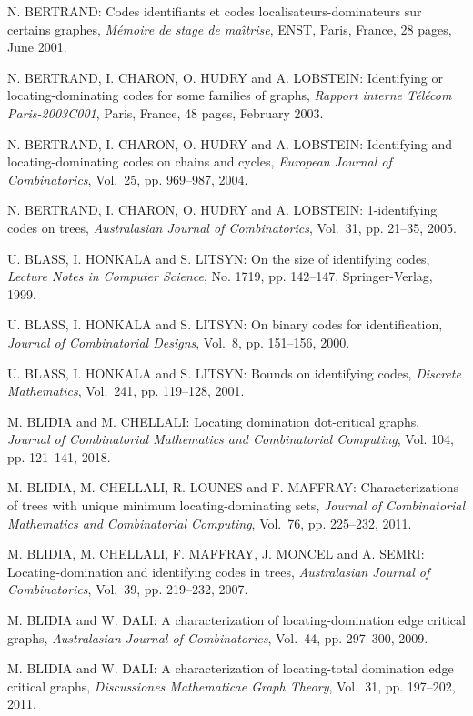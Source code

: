 \begin{thebibliography}{999}
N. BERTRAND: Codes identifiants et codes localisateurs-dominateurs sur certains graphes, {\it M\'emoire de stage de ma\^{\i}trise}, ENST, Paris, France, 28 pages, June 2001.

N. BERTRAND, I. CHARON, O. HUDRY and A. LOBSTEIN: Identifying or locating-dominating codes for some families of graphs, {\it Rapport interne T\'el\'ecom Paris-2003C001}, Paris, France, 48 pages, February 2003.

N. BERTRAND, I. CHARON, O. HUDRY and A. LOBSTEIN: Identifying and locating-dominating codes on chains and cycles, {\it European Journal of Combinatorics}, Vol.~25, pp. 969--987, 2004.

N. BERTRAND, I. CHARON, O. HUDRY and A. LOBSTEIN: 1-identifying codes on trees, {\it Australasian Journal of Combinatorics}, Vol.~31, pp. 21--35, 2005.

U. BLASS, I. HONKALA and S. LITSYN: On the size of identifying codes, {\it Lecture Notes in Computer Science}, No. 1719, pp. 142--147, Springer-Verlag, 1999.

U. BLASS, I. HONKALA and S. LITSYN: On binary codes for identification, {\it Journal of Combinatorial Designs}, Vol.~8, pp. 151--156, 2000.

U. BLASS, I. HONKALA and S. LITSYN: Bounds on identifying codes, {\it Discrete Mathematics}, Vol.~241, pp. 119--128, 2001.

M. BLIDIA and M. CHELLALI: Locating domination dot-critical graphs, {\it Journal of Combinatorial Mathematics and Combinatorial Computing}, Vol. 104, pp. 121--141, 2018.

M. BLIDIA, M. CHELLALI, R. LOUNES and F. MAFFRAY: Characterizations of trees with unique minimum locating-dominating sets, {\it Journal of Combinatorial Mathematics and Combinatorial Computing}, Vol.~76, pp. 225--232, 2011.

M. BLIDIA, M. CHELLALI, F. MAFFRAY, J. MONCEL and A. SEMRI: Locating-domination and identifying codes in trees, {\it Australasian Journal of Combinatorics}, Vol.~39, pp. 219--232, 2007.

M. BLIDIA and W. DALI: A characterization of locating-domination edge critical graphs, {\it Australasian Journal of Combinatorics}, Vol.~44, pp. 297--300, 2009.

M. BLIDIA and W. DALI: A characterization of locating-total domination edge critical graphs, {\it Discussiones Mathematicae Graph Theory}, Vol.~31, pp. 197--202, 2011.


\end{thebibliography}

